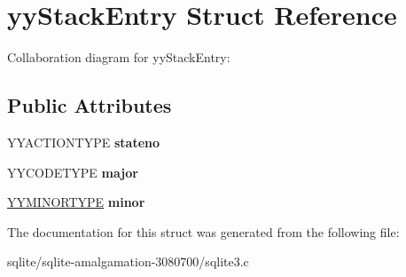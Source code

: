 \hypertarget{structyy_stack_entry}{\section{yy\+Stack\+Entry Struct Reference}
\label{structyy_stack_entry}
}


Collaboration diagram for yy\+Stack\+Entry\+:
\subsection*{Public Attributes}
\begin{DoxyCompactItemize}
\item 
\hypertarget{structyy_stack_entry_a108164609c2e841577cc3533d8f0180d}{Y\+Y\+A\+C\+T\+I\+O\+N\+T\+Y\+P\+E {\bfseries stateno}}\label{structyy_stack_entry_a108164609c2e841577cc3533d8f0180d}

\item 
\hypertarget{structyy_stack_entry_a7624d02bcf945d48068f4c383551725c}{Y\+Y\+C\+O\+D\+E\+T\+Y\+P\+E {\bfseries major}}\label{structyy_stack_entry_a7624d02bcf945d48068f4c383551725c}

\item 
\hypertarget{structyy_stack_entry_a024e1e64bce5945080629a2dd8d1bb4f}{\hyperlink{union_y_y_m_i_n_o_r_t_y_p_e}{Y\+Y\+M\+I\+N\+O\+R\+T\+Y\+P\+E} {\bfseries minor}}\label{structyy_stack_entry_a024e1e64bce5945080629a2dd8d1bb4f}

\end{DoxyCompactItemize}


The documentation for this struct was generated from the following file\+:\begin{DoxyCompactItemize}
\item 
sqlite/sqlite-\/amalgamation-\/3080700/sqlite3.\+c\end{DoxyCompactItemize}
